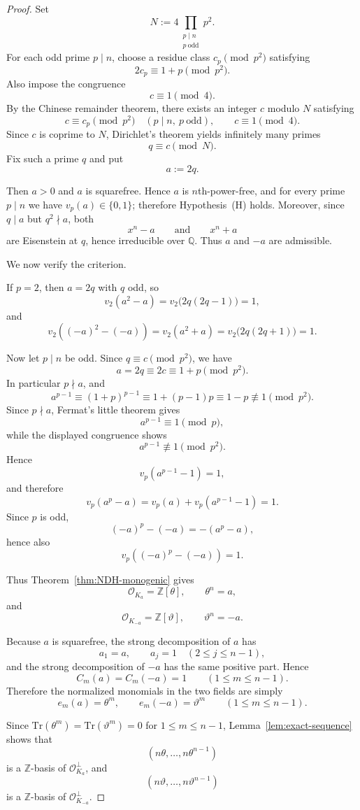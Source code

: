 \documentclass[11pt,letterpaper]{amsart}
\newcommand{\Q}{\mathbb{Q}}
\newcommand{\Z}{\mathbb{Z}}
\newcommand{\cO}{\mathcal{O}}
\newcommand{\Tr}{\mathrm{Tr}}
\theoremstyle{plain}
\theoremstyle{definition}
\begin{document}
\begin{proof}
Set
\[
N:=4\prod_{\substack{p\mid n\\ p\ \mathrm{odd}}} p^2.
\]
For each odd prime \(p\mid n\), choose a residue class \(c_p\pmod{p^2}\) satisfying
\[
2c_p\equiv 1+p \pmod{p^2}.
\]
Also impose the congruence
\[
c\equiv 1 \pmod 4.
\]
By the Chinese remainder theorem, there exists an integer \(c\) modulo \(N\) satisfying
\[
c\equiv c_p \pmod{p^2}\quad (p\mid n,\ p\ \mathrm{odd}),
\qquad
c\equiv 1\pmod 4.
\]
Since \(c\) is coprime to \(N\), Dirichlet's theorem yields infinitely many primes
\[
q\equiv c \pmod N.
\]
Fix such a prime \(q\) and put
\[
a:=2q.
\]

Then \(a>0\) and \(a\) is squarefree. Hence \(a\) is \(n\)th-power-free, and for every prime
\(p\mid n\) we have \(v_p(a)\in\{0,1\}\); therefore Hypothesis~\textup{(H)} holds.
Moreover, since \(q\mid a\) but \(q^2\nmid a\), both
\[
x^n-a\qquad\text{and}\qquad x^n+a
\]
are Eisenstein at \(q\), hence irreducible over \(\Q\). Thus \(a\) and \(-a\) are admissible.

We now verify the criterion.

If \(p=2\), then \(a=2q\) with \(q\) odd, so
\[
v_2(a^2-a)=v_2\bigl(2q(2q-1)\bigr)=1,
\]
and
\[
v_2((-a)^2-(-a))=v_2(a^2+a)=v_2\bigl(2q(2q+1)\bigr)=1.
\]

Now let \(p\mid n\) be odd. Since \(q\equiv c\pmod{p^2}\), we have
\[
a=2q\equiv 2c\equiv 1+p \pmod{p^2}.
\]
In particular \(p\nmid a\), and
\[
a^{p-1}\equiv (1+p)^{p-1}\equiv 1+(p-1)p \equiv 1-p \not\equiv 1 \pmod{p^2}.
\]
Since \(p\nmid a\), Fermat's little theorem gives
\[
a^{p-1}\equiv 1 \pmod p,
\]
while the displayed congruence shows
\[
a^{p-1}\not\equiv 1 \pmod{p^2}.
\]
Hence
\[
v_p(a^{p-1}-1)=1,
\]
and therefore
\[
v_p(a^p-a)=v_p(a)+v_p(a^{p-1}-1)=1.
\]
Since \(p\) is odd,
\[
(-a)^p-(-a)=-(a^p-a),
\]
hence also
\[
v_p((-a)^p-(-a))=1.
\]

Thus Theorem~\ref{thm:NDH-monogenic} gives
\[
\cO_{K_a}=\Z[\theta],\qquad \theta^n=a,
\]
and
\[
\cO_{K_{-a}}=\Z[\vartheta],\qquad \vartheta^n=-a.
\]

Because \(a\) is squarefree, the strong decomposition of \(a\) has
\[
a_1=a,\qquad a_j=1\quad (2\le j\le n-1),
\]
and the strong decomposition of \(-a\) has the same positive part. Hence
\[
C_m(a)=C_m(-a)=1
\qquad (1\le m\le n-1).
\]
Therefore the normalized monomials in the two fields are simply
\[
e_m(a)=\theta^m,
\qquad
e_m(-a)=\vartheta^m
\qquad (1\le m\le n-1).
\]

Since \(\Tr(\theta^m)=\Tr(\vartheta^m)=0\) for \(1\le m\le n-1\), Lemma~\ref{lem:exact-sequence}
shows that
\[
(n\theta,\dots,n\theta^{n-1})
\]
is a \(\Z\)-basis of \(\cO_{K_a}^{\perp}\), and
\[
(n\vartheta,\dots,n\vartheta^{n-1})
\]
is a \(\Z\)-basis of \(\cO_{K_{-a}}^{\perp}\).


\end{proof}
\end{document}

